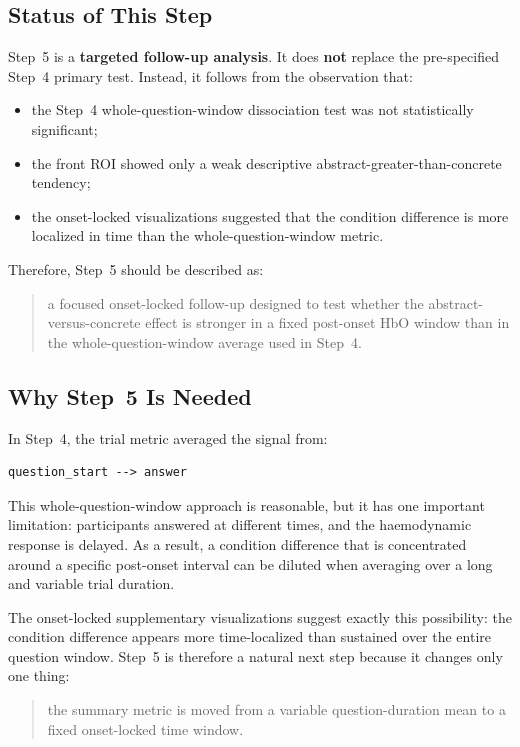 \documentclass[11pt]{article}
\begin{document}
\subsection{Status of This Step}
Step~5 is a \textbf{targeted follow-up analysis}.
It does \textbf{not} replace the pre-specified Step~4 primary test.
Instead, it follows from the observation that:
\begin{itemize}
    \item the Step~4 whole-question-window dissociation test was not statistically significant;
    \item the front ROI showed only a weak descriptive abstract-greater-than-concrete tendency;
    \item the onset-locked visualizations suggested that the condition difference is more localized
    in time than the whole-question-window metric.
\end{itemize}

Therefore, Step~5 should be described as:
\begin{quote}
a focused onset-locked follow-up designed to test whether the abstract-versus-concrete effect is
stronger in a fixed post-onset HbO window than in the whole-question-window average used in Step~4.
\end{quote}

\subsection{Why Step~5 Is Needed}
In Step~4, the trial metric averaged the signal from:
\begin{verbatim}
question_start --> answer
\end{verbatim}

This whole-question-window approach is reasonable, but it has one important limitation:
participants answered at different times, and the haemodynamic response is delayed.
As a result, a condition difference that is concentrated around a specific post-onset interval can be
diluted when averaging over a long and variable trial duration.

The onset-locked supplementary visualizations suggest exactly this possibility:
the condition difference appears more time-localized than sustained over the entire question window.
Step~5 is therefore a natural next step because it changes only one thing:
\begin{quote}
the summary metric is moved from a variable question-duration mean to a fixed onset-locked time window.
\end{quote}
\end{document}
